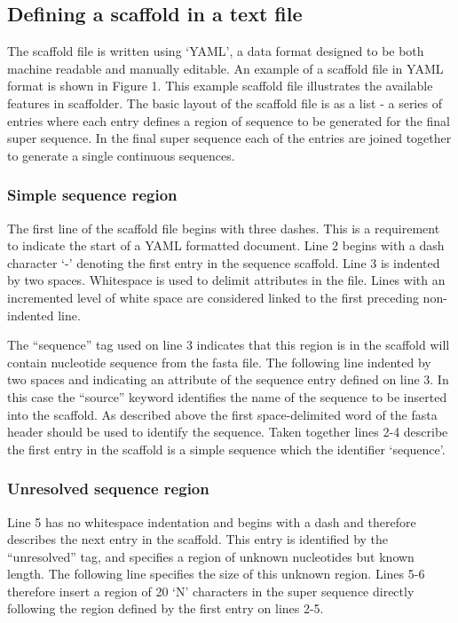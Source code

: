 \documentclass[10pt]{bmc_article}
\newenvironment{bmcformat}{\begin{raggedright}\baselineskip20pt\sloppy\setboolean{publ}{false}}{\end{raggedright}\baselineskip20pt\sloppy}
\begin{document}
\begin{bmcformat}
\subsection*{Defining a scaffold in a text file} %

The scaffold file is written using `YAML', a data format designed to be both
machine readable and manually editable. An example of a scaffold file in YAML
format is shown in Figure 1. This example scaffold file illustrates the
available features in scaffolder. The basic layout of the scaffold file is as
a list - a series of entries where each entry defines a region of sequence to
be generated for the final super sequence. In the final super sequence each of
the entries are joined together to generate a single continuous sequences. \pb

\subsubsection*{Simple sequence region} %

The first line of the scaffold file begins with three dashes. This is
a requirement to indicate the start of a YAML formatted document. Line 2 begins
with a dash character `-' denoting the first entry in the sequence scaffold.
Line 3 is indented by two spaces. Whitespace is used to delimit attributes in
the file. Lines with an incremented level of white space are considered linked
to the first preceding non-indented line. \pb

The ``sequence'' tag used on line 3 indicates that this region is in the
scaffold will contain nucleotide sequence from the fasta file. The following
line indented by two spaces and indicating an attribute of the sequence entry
defined on line 3. In this case the ``source'' keyword identifies the name of
the sequence to be inserted into the scaffold. As described above the first
space-delimited word of the fasta header should be used to identify the
sequence. Taken together lines 2-4 describe the first entry in the scaffold is
a simple sequence which the identifier `sequence'. \pb

\subsubsection*{Unresolved sequence region} %

Line 5 has no whitespace indentation and begins with a dash and therefore
describes the next entry in the scaffold. This entry is identified by the
``unresolved'' tag, and specifies a region of unknown nucleotides but known
length. The following line specifies the size of this unknown region. Lines 5-6
therefore insert a region of 20 `N' characters in the super sequence directly
following the region defined by the first entry on lines 2-5. \pb


\end{bmcformat}
\end{document}

